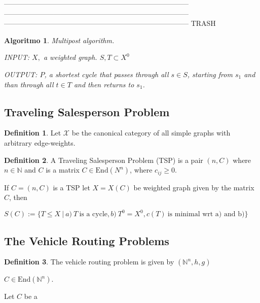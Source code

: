 \documentclass[]{article}
\newtheorem{algo}{Algoritmo}[section]
\theoremstyle{definition}
\newtheorem{definition}{Definition}[section]
\theoremstyle{definition}
\newcommand{\bb}{\mathbb}
\newcommand{\cax}{\mathcal{X}}
\begin{document}
------------------------------------------------------------------------------
------------------------------------------------------------------------------
------------------------------------------------------------------------------
TRASH

\begin{algo}
	
	Multipost algorithm. 
	
	INPUT: $X,$ a weighted graph. $S, T \subset X^0$
	
	OUTPUT: $P$, a shortest cycle that passes through all $s \in S$, starting from $s_1$ and than through all $t \in T$ and then returns to $s_1$.
	
\end{algo}


\subsection{Traveling Salesperson Problem}

\begin{definition}
	Let $\cax$ be the canonical category of all simple graphs with arbitrary edge-weights. 
\end{definition}

\begin{definition}
	A Traveling Salesperson Problem (TSP) is a pair $(n, C)$ where $n \in \bb{N}$ and $C$ is a matrix $C \in \text{End}(N^n)$, where $c_{ij} \geq 0$.

	If $C = (n, C)$ is a TSP let $X = X(C)$ be weighted graph given by the matrix $C$, then 
	
	\begin{center}
		$S(C) := \{ T \leq X \ | \ a)\ T \ \text{is a cycle}, b)\ T^0 = X^0, c(T) \ \text{is minimal wrt a) and b)}  \}$
	\end{center}
	
\end{definition}

\subsection{The Vehicle Routing Problems}

\begin{definition}
	The vehicle routing problem is given by $(\bb{N}^n, h, g)$
	
	
	  $C \in 
	\text{End}(\bb{N}^n)$.

	Let $C$ be a 

\end{definition}
\end{document}
